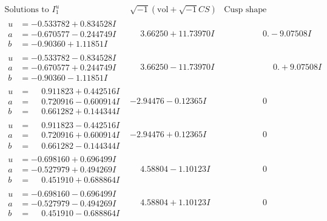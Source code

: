 \documentclass[1p]{elsarticle_modified}
\theoremstyle{definition}
\newcommand{\I}{\sqrt{-1}}
\begin{document}
$$\begin{array}{c|c|c}  
\text{Solutions to }I^u_{1}& \I (\text{vol} + \sqrt{-1}CS) & \text{Cusp shape}\\
 \hline 
\begin{aligned}
u &= -0.533782 + 0.834528 I \\
a &= -0.670577 - 0.244749 I \\
b &= -0.90360 + 1.11851 I\end{aligned}
 & \phantom{-}3.66250 + 11.73970 I & \phantom{-0.000000 } 0. - 9.07508 I \\ \hline\begin{aligned}
u &= -0.533782 - 0.834528 I \\
a &= -0.670577 + 0.244749 I \\
b &= -0.90360 - 1.11851 I\end{aligned}
 & \phantom{-}3.66250 - 11.73970 I & \phantom{-0.000000 -}0. + 9.07508 I \\ \hline\begin{aligned}
u &= \phantom{-}0.911823 + 0.442516 I \\
a &= \phantom{-}0.720916 - 0.600914 I \\
b &= \phantom{-}0.661282 + 0.144344 I\end{aligned}
 & -2.94476 - 0.12365 I & \phantom{-0.000000 } 0 \\ \hline\begin{aligned}
u &= \phantom{-}0.911823 - 0.442516 I \\
a &= \phantom{-}0.720916 + 0.600914 I \\
b &= \phantom{-}0.661282 - 0.144344 I\end{aligned}
 & -2.94476 + 0.12365 I & \phantom{-0.000000 } 0 \\ \hline\begin{aligned}
u &= -0.698160 + 0.696499 I \\
a &= -0.527979 + 0.494269 I \\
b &= \phantom{-}0.451910 + 0.688864 I\end{aligned}
 & \phantom{-}4.58804 - 1.10123 I & \phantom{-0.000000 } 0 \\ \hline\begin{aligned}
u &= -0.698160 - 0.696499 I \\
a &= -0.527979 - 0.494269 I \\
b &= \phantom{-}0.451910 - 0.688864 I\end{aligned}
 & \phantom{-}4.58804 + 1.10123 I & \phantom{-0.000000 } 0 \\ \hline\begin{aligned}

\end{aligned}
\end{array}$$
\end{document}
